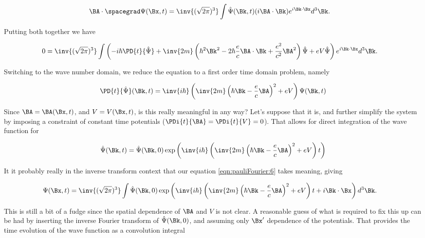\begin{align}\label{eqn:pauliFourier:xx2}
\BA \cdot \spacegrad \Psi(\Bx, t) &=
\inv{(\sqrt{2 \pi})^3} \int \hat{\Psi}(\Bk, t) (i \BA \cdot \Bk) e^{i \Bk \cdot \Bx} d^3 \Bk.
\end{align}

Putting both together we have

\begin{align}\label{eqn:pauliFourier:5}
0 &= 
\inv{(\sqrt{2 \pi})^3} \int 
\left(
-i \hbar \PD{t}{\hat{\Psi}} + \inv{2m} \left( \hbar^2 \Bk^2 - 2 \hbar \frac{e}{c} \BA \cdot \Bk + \frac{e^2}{c^2} \BA^2 \right) \hat{\Psi} + e V \hat{\Psi} \right)
e^{i \Bk \cdot \Bx} d^3 \Bk.
\end{align}

Switching to the wave number domain, we reduce the equation to a first order time domain problem, namely

\begin{align}\label{eqn:pauliFourier:6}
\PD{t}{\hat{\Psi}}(\Bk, t) = \inv{i \hbar} \left( \inv{2m} \left( \hbar \Bk - \frac{e}{c} \BA \right)^2 + e V \right) \Psi(\Bk, t)
\end{align}

Since $\BA = \BA(\Bx, t)$, and $V = V(\Bx, t)$, is this really meaningful in any way?  Let's suppose that it is, and further simplify the system by imposing a constraint of constant time potentials ($\PDi{t}{\BA} = \PDi{t}{V} = 0$).  That allows for direct integration of the wave function for

\begin{align}\label{eqn:pauliFourier:7}
\hat{\Psi}(\Bk, t) = \hat{\Psi}(\Bk, 0) \exp\left(
\inv{i \hbar} \left( \inv{2m} \left( \hbar \Bk - \frac{e}{c} \BA \right)^2 + e V \right) t
\right)
\end{align}

It it probably really in the inverse transform context that our equation \ref{eqn:pauliFourier:6} takes meaning, giving

\begin{align}\label{eqn:pauliFourier:8}
\Psi(\Bx, t) &= \inv{(\sqrt{2 \pi})^3} \int 
\hat{\Psi}(\Bk, 0) \exp\left(
\inv{i \hbar} \left( \inv{2m} \left( \hbar \Bk - \frac{e}{c} \BA \right)^2 + e V \right) t
+ i \Bk \cdot \Bx
\right)
d^3 \Bk.
\end{align}

This is still a bit of a fudge since the spatial dependence of $\BA$ and $V$ is not clear.  A reasonable guess of what is required to fix this up can be had by inserting the inverse Fourier transform of $\hat{\Psi}(\Bk, 0)$, and assuming only $\Bx'$ dependence of the potentials.  That provides the time evolution of the wave function as a convolution integral

